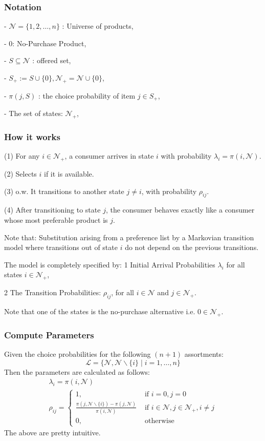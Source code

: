 \documentclass[11pt]{elegantbook}
\begin{document}
\subsubsection{Notation}
- $\mathcal{N}=\{1,2, \ldots, n\}$ : Universe of products,

- 0: No-Purchase Product,

- $S \subseteq \mathcal{N}$ : offered set,

- $S_{+}:=S \cup\{0\}, \mathcal{N}_{+}=\mathcal{N} \cup\{0\}$,

- $\pi(j, S)$ : the choice probability of item $j \in S_{+}$,

- The set of states: $\mathcal{N}_{+}$,

\subsubsection{How it works}
(1) For any $i \in \mathcal{N}_{+}$, a consumer arrives in state $i$ with probability $\lambda_{i}=\pi(i, \mathcal{N})$.

(2) Selects $i$ if it is available.

(3) o.w. It transitions to another state $j \neq i$, with probability $\rho_{i j}$.

(4) After transitioning to state $j$, the consumer behaves exactly like a consumer whose most preferable product is $j$.

Note that: Substitution arising from a preference list by a Markovian transition model where transitions out of state $i$ do not depend on the previous transitions.

The model is completely specified by:
1 Initial Arrival Probabilities $\lambda_{i}$ for all states $i \in \mathcal{N}_+$,

2 The Transition Probabilities: $\rho_{ij}$, for all $i \in \mathcal{N}$ and $j \in \mathcal{N}_+$.

Note that one of the states is the no-purchase alternative i.e. $0 \in \mathcal{N}_+$.

\subsubsection{Compute Parameters}
Given the choice probabilities for the following $(n+1)$ assortments:
$$
\mathcal{L}=\{\mathcal{N}, \mathcal{N} \backslash\{i\} \mid i=1, \ldots, n\}
$$
Then the parameters are calculated as follows:
$$
\begin{gathered}
\lambda_{i}=\pi(i, \mathcal{N}) \\
\rho_{i j}= \begin{cases}1, & \text { if } i=0, j=0 \\
\frac{\pi(j, \mathcal{N} \backslash\{i\})-\pi(j, \mathcal{N})}{\pi(i, \mathcal{N})} & \text { if } i \in \mathcal{N}, j \in \mathcal{N}_{+}, i \neq j \\
0, & \text { otherwise }\end{cases}
\end{gathered}
$$
The above are pretty intuitive.
\end{document}
